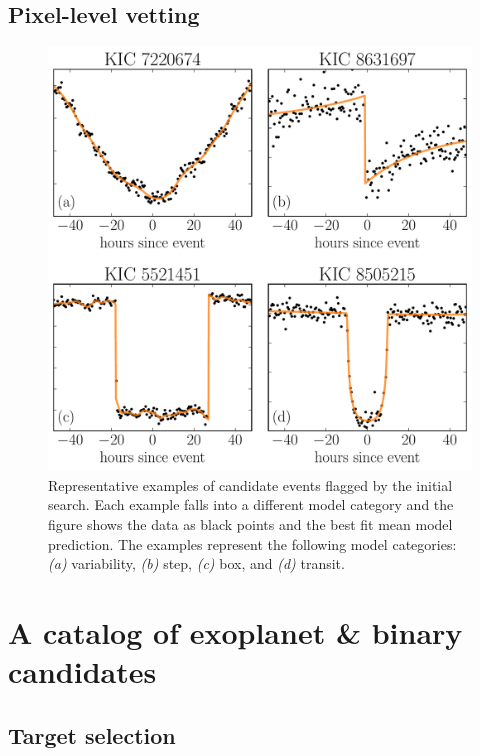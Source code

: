 \documentclass[manuscript, letterpaper]{aastex6}
\newcommand{\figlabel}[1]{\label{fig:#1}}
\newcommand{\sectlabel}[1]{\label{sect:#1}}
\begin{document}
\subsection{Pixel-level vetting}


\begin{figure}
\vspace{\baselineskip}
\begin{center}
\includegraphics[width=\textwidth]{figures/model_comp.pdf}
\end{center}
\caption{%
Representative examples of candidate events flagged by the initial search.
Each example falls into a different model category and the figure shows the
data as black points and the best fit mean model prediction.
The examples represent the following model categories:
\emph{(a)} variability, \emph{(b)} step, \emph{(c)} box, and \emph{(d)}
transit.
\figlabel{model-comp}}
\end{figure}


\section{A catalog of exoplanet \& binary candidates}


\subsection{Target selection}\sectlabel{data}
\end{document}
